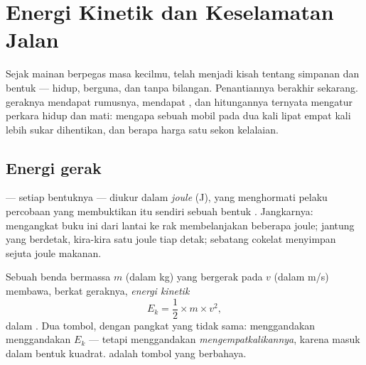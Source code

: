 \chapter{Energi Kinetik dan Keselamatan Jalan}\label{ch:g9:kinetic-energy-safety}

Sejak mainan berpegas masa kecilmu,  telah menjadi kisah tentang
simpanan dan bentuk --- hidup, berguna, dan tanpa bilangan.
Penantiannya berakhir sekarang.  geraknya mendapat rumusnya,
 mendapat , dan hitungannya ternyata mengatur perkara
hidup dan mati: mengapa sebuah mobil pada  dua kali lipat empat
kali lebih sukar dihentikan, dan berapa  harga satu sekon kelalaian.

\section{Energi gerak}

\begin{definition}[Joule]\label{def:g9:kinetic-energy-safety:joule}
 --- setiap bentuknya --- diukur dalam
\emph{joule} (\unit{J}), yang menghormati pelaku
percobaan yang membuktikan  itu sendiri sebuah bentuk .
Jangkarnya: mengangkat buku ini dari lantai ke rak membelanjakan
beberapa joule; jantung yang berdetak, kira-kira satu joule tiap
detak; sebatang cokelat menyimpan sejuta joule  makanan.
\end{definition}

\begin{proposition}\label{prop:g9:kinetic-energy-safety:formula}
Sebuah benda bermassa $m$ (dalam \unit{kg}) yang bergerak pada
 $v$ (dalam \unit{m/s}) membawa, berkat geraknya,
\emph{energi kinetik}
\[
E_k = \frac{1}{2} \times m \times v^2 ,
\]
dalam . Dua tombol, dengan pangkat yang tidak sama: menggandakan
 menggandakan $E_k$ --- tetapi menggandakan \emph{}
\emph{mengempatkalikannya}, karena  masuk dalam bentuk
kuadrat.  adalah tombol yang berbahaya.
\end{proposition}

